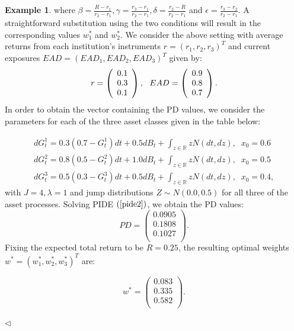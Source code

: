 \documentclass[11pt,reqno]{article}
\theoremstyle{definition}
\newtheorem{example}[theorem]{Example}
\begin{document}
\begin{example}
where $\beta=\frac{R-r_1}{r_2-r_1}, \gamma=\frac{r_3-r_1}{r_2-r_1}, \delta = \frac{r_2-R}{r_2-r_1}$ and $\epsilon=\frac{r_3-r_2}{r_2-r_1}$. A straightforward substitution using the two conditions will result in the corresponding values $w_1^*$ and $w_2^*$.
We consider the above setting with average returns from each institution's instruments $r=(r_1,r_2,r_3)^T$ and current exposures $EAD=(EAD_1,EAD_2,EAD_3)^T$ given by:
\begin{eqnarray}\notag
r=\left( \begin{array}{c}
0.1 \\
0.3 \\
0.1 \\
\end{array}
\right),
\,\,\,\,
EAD=\left(  \begin{array}{c}
0.9  \\
0.8 \\
0.7 \\
\end{array}
\right).
\end{eqnarray}
In order to obtain the vector containing the PD values, we consider the parameters for each of the three asset classes given in the table below:

\begin{eqnarray}
		dG^1_t=0.3(0.7 - G^1_t)dt + 0.5 dB_t +  \int_{z\in \mathbb{R}} z N(dt,dz), \,\,\ x_0 = 0.6\\
		dG^2_t=0.8(0.5 - G^2_t)dt + 1.0 dB_t +  \int_{z\in \mathbb{R}} z N(dt,dz), \,\,\ x_0 = 0.5\\
		dG^3_t=0.5(0.3 - G^3_t)dt + 0.5 dB_t +  \int_{z\in \mathbb{R}} z N(dt,dz),\,\,\ x_0 = 0.4,
\end{eqnarray}
with $J = 4, \lambda =1$ and jump distributions $Z \sim N(0.0,0.5)$ for all three of the asset processes.
Solving PIDE $(\ref{pide2})$, we obtain the PD values:
$$PD=\left( \begin{array}{c}
0.0905\\
0.1808	\\
0.1027 \\
\end{array}
\right).$$
Fixing the expected total return to be $R=0.25$, the resulting optimal weights $w^*=(w_1^*,w_2^*,w_3^*)^T$ are:

$$w^*=\left( \begin{array}{c}
0.083\\
0.335\\
0.582 \\
\end{array}
\right).$$
\end{example}  \hfill $\triangleleft$\\
\end{document}
